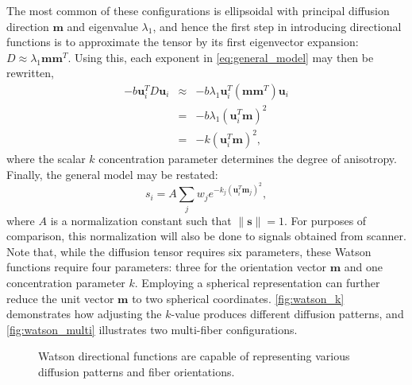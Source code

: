 \documentclass[final,hyperref]{gatech-thesis}
\renewcommand{\v}[1]{\ensuremath{\mathbf #1}\xspace}
\newcommand{\s}{\v s}
\renewcommand{\u}{\v u}
\newcommand{\m}{\v m}
\newcommand{\norm}[1]{\ensuremath{\|#1\|}}
\begin{document}
The most common of these configurations is ellipsoidal with principal
diffusion direction $\m$ and eigenvalue $\lambda_1$, and hence the first step
in introducing directional functions is to approximate the tensor by its first
eigenvector expansion: $D \approx \lambda_1 \m \m^T$.  Using this, each
exponent in \autoref{eq:general_model} may then be rewritten,
\begin{eqnarray} \label{eq:approx}
  -b \u_i^T D \u_i
  &\approx& -b\lambda_1\u_i^T\left(\m\m^T\right)\u_i \\
  &=& -b \lambda_1 \left(\u_i^T \m\right)^2 \\
  &=& -k \left(\u_i^T \m\right)^2 ,
\end{eqnarray}
where the scalar $k$ concentration parameter determines the degree of
anisotropy.  Finally, the general model may be restated:
\begin{equation} \label{eq:watson_model}
  s_i = A \sum_j w_j e^{-k_j (\u_i^T \m_j)^2} ,
\end{equation}
where $A$ is a normalization constant such that $\norm{\s}=1$.  For purposes
of comparison, this normalization will also be done to signals obtained from
scanner.  Note that, while the diffusion tensor requires six parameters, these
Watson functions require four parameters: three for the orientation vector
$\m$ and one concentration parameter $k$.  Employing a spherical
representation can further reduce the unit vector \m to two spherical
coordinates.  \autoref{fig:watson_k} demonstrates how adjusting the $k$-value
produces different diffusion patterns, and \autoref{fig:watson_multi}
illustrates two multi-fiber configurations.
\begin{figure}[t]
  \centering
  \hspace{1em}%
  \caption{Watson directional functions are capable of representing various
    diffusion patterns and fiber orientations.}
  \label{fig:watson}
\end{figure}
\end{document}
